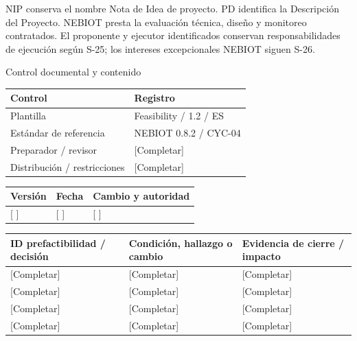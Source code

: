 \vspace{2mm}
NIP conserva el nombre Nota de Idea de proyecto. PD identifica la Descripción del Proyecto.
\vspace{2mm}
NEBIOT presta la evaluación técnica, diseño y monitoreo contratados. El proponente y ejecutor identificados conservan responsabilidades de ejecución según S-25; los intereses excepcionales NEBIOT siguen S-26.
\clearpage
{\fontsize{23}{27}\selectfont\color{NEBGreen}Control documental y contenido\par}
\vspace{3mm}
{\sffamily\fontsize{8.3}{10.3}\selectfont\begin{longtable}{@{}P{50.55mm} P{117.94mm}@{}}
\toprule
\textbf{Control} & \textbf{Registro}\\\midrule\endhead
\rule{0pt}{7.7mm}Plantilla & Feasibility / 1.2 / ES\\\hline
\rule{0pt}{7.7mm}Estándar de referencia & NEBIOT 0.8.2 / CYC-04\\\hline
\rule{0pt}{7.7mm}Preparador / revisor & [Completar]\\\hline
\rule{0pt}{7.7mm}Distribución / restricciones & [Completar]\\\hline
\end{longtable}}
{\sffamily\fontsize{8.3}{10.3}\selectfont\begin{longtable}{@{}P{31.34mm} P{37.94mm} P{95.68mm}@{}}
\toprule
\textbf{Versión} & \textbf{Fecha} & \textbf{Cambio y autoridad}\\\midrule\endhead
\rule{0pt}{7.7mm}[ ] & [ ] & [ ]\\\hline
\end{longtable}}
{\sffamily\fontsize{9.5}{11.4}\selectfont\tableofcontents}
{\sffamily\fontsize{8.3}{10.3}\selectfont\begin{longtable}{@{}P{49.49mm} P{57.74mm} P{57.74mm}@{}}
\toprule
\textbf{ID prefactibilidad / decisión} & \textbf{Condición, hallazgo o cambio} & \textbf{Evidencia de cierre / impacto}\\\midrule\endhead
\rule{0pt}{7.7mm}[Completar] & [Completar] & [Completar]\\\hline
\rule{0pt}{7.7mm}[Completar] & [Completar] & [Completar]\\\hline
\rule{0pt}{7.7mm}[Completar] & [Completar] & [Completar]\\\hline
\rule{0pt}{7.7mm}[Completar] & [Completar] & [Completar]\\\hline
\end{longtable}}
